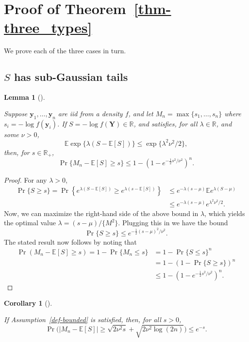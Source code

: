 \documentclass[
  12pt]{article}
\newcommand{\E}{\mathbb{E}}
\theoremstyle{plain}
\theoremstyle{plain}
\newtheorem{corollary}{Corollary}[section]
\theoremstyle{definition}
\theoremstyle{plain}
\newtheorem{lemma}{Lemma}[section]
\theoremstyle{remark}
\begin{document}
\section{\texorpdfstring{Proof of
Theorem~\ref{thm-three_types}}{Proof of Theorem~}}\label{proof-of-thm-three_types}

We prove each of the three cases in turn.

\subsection{\texorpdfstring{\(S\) has sub-Gaussian
tails}{S has sub-Gaussian tails}}\label{s-has-sub-gaussian-tails}

\begin{lemma}[]\protect\hypertarget{lem-bounds}{}\label{lem-bounds}

Suppose \(\bm{y}_1,\dots,\bm{y}_n\) are iid from a density \(f\), and
let \(M_n = \max\{s_1,\dots,s_n\}\) where \(s_i = -\log f(\bm{y}_i)\).
If \(S =-\log f(\bm{Y})\in\mathbb{R}\), and satisfies, for all
\(\lambda\in\mathbb{R}\), and some \(\nu>0\), \[
\E \exp\{\lambda (S-\E[S])\}\le \exp\{\lambda^2 \nu^2/2\},
\] then, for \(s\in\mathbb{R}_+\), \[
\Pr\{M_n-\E[S]\ge s\}\le 1-\left(1-e^{-\frac{1}{2}s^2/\nu^2}\right)^n.
\]

\end{lemma}

\begin{proof}
For any \(\lambda>0\), \begin{align}
\Pr\{S\ge s\} =
\Pr\left\{e^{\lambda (S-\E[S])}\ge e^{\lambda (s-\E[S])}\right\}
 & \le e^{-\lambda(s-\mu)}\E e^{\lambda (S-\mu)} \\
 & \le e^{-\lambda(s-\mu)}e^{\lambda^2\nu^2/2}.
\end{align} Now, we can maximize the right-hand side of the above bound
in \(\lambda\), which yields the optimal value
\(\lambda=(s-\mu)/\{M^2\}\). Plugging this in we have the bound \[
\Pr\{S\ge s\}\le e^{-\frac{1}{2}(s-\mu)^2/\nu^2}.
\] The stated result now follows by noting that \begin{align}
\Pr\left(M_n-\E[S]\ge s\right) = 1-\Pr\{M_n\le s\}
 & = 1-\Pr\{S\le s\}^n                       \\
 & = 1-(1-\Pr\{S\ge s\})^n                           \\
 & \le 1-\left(1-e^{-\frac{1}{2}s^2/\nu^2}\right)^n.
\end{align}
\end{proof}

\begin{corollary}[]\protect\hypertarget{cor-one}{}\label{cor-one}

If Assumption~\ref{def-bounded} is satisfied, then, for all \(s>0\), \[
\Pr\Big(|M_n-\E[S]| \ge \sqrt{2\nu^2s} + \sqrt{2\nu^2\log(2n)}\Big) \le e^{-s}.
\]

\end{corollary}
\end{document}
